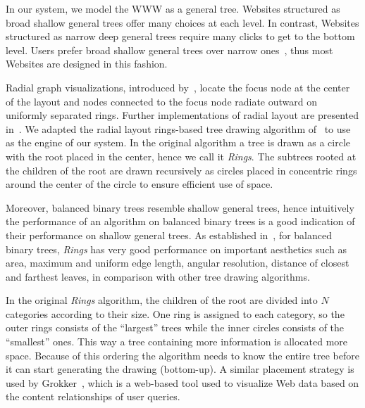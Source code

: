 \documentclass[10pt,psfig]{article}
\begin{document}
{%
In our system, we model the WWW as a general tree.
Websites structured as broad shallow general trees offer many choices at each level.
In contrast, Websites structured as narrow deep general trees require many clicks to get to the bottom level.
Users prefer broad shallow general trees over narrow ones~\cite{mw-04}, thus most Websites are designed in this fashion.

Radial graph visualizations, introduced by~\cite{dett-gd-99, e-92}, locate the focus node at the center of the layout 
and nodes connected to the focus node radiate outward on uniformly separated rings.
Further implementations of radial layout are presented in~\cite{km-03, sz-00, yfdh-01}.
We adapted the radial layout rings-based tree drawing algorithm of~\cite{tm02} to use as the engine of our system.
In the original algorithm a tree is drawn as a circle with the root placed in the center, hence we call it {\em Rings}.
The subtrees rooted at the children of the root are drawn recursively as circles placed in concentric rings around the 
center of the circle to ensure efficient use of space.

Moreover, balanced binary trees resemble shallow general trees, hence intuitively the performance of an algorithm on
balanced binary trees is a good indication of their performance on shallow general trees.
As established in~\cite{rjsc-06}, for balanced binary trees, {\em Rings} has very good performance on important aesthetics such as area, maximum and uniform edge length, angular resolution, distance of closest and farthest leaves, in comparison with other tree drawing algorithms.

In the original {\em Rings} algorithm, the children of the root are divided into $N$ categories according to their size.  
One ring is assigned to each category, so the outer rings consists of the ``largest'' trees while the inner circles consists of the ``smallest'' ones.  
This way a tree containing more information is allocated more space.
Because of this ordering the algorithm needs to know the entire tree before it can start generating the drawing (bottom-up).
A similar placement strategy is used by Grokker~\cite{grokker}, which is a web-based tool used to visualize Web data based on the content relationships of user queries.

}
\end{document}
